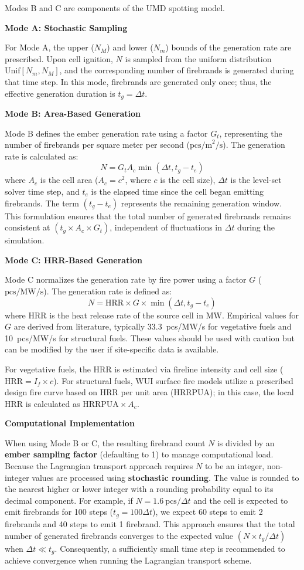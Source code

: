 Modes B and C are components of the UMD spotting model.

\textbf{Mode A: Stochastic Sampling}

For Mode A, the upper ($N_M$) and lower ($N_m$) bounds of the generation rate are prescribed. Upon cell ignition, $N$ is sampled from the uniform distribution $\text{Unif}[N_m, N_M]$, and the corresponding number of firebrands is generated during that time step. In this mode, firebrands are generated only once; thus, the effective generation duration is $t_g = \Delta t$.

\textbf{Mode B: Area-Based Generation}

Mode B defines the ember generation rate using a factor $G_t$, representing the number of firebrands per square meter per second ($\text{pcs/m}^2/\text{s}$). The generation rate is calculated as:
\[
N = G_t A_c \min(\Delta t, t_g - t_e)
\]
where $A_c$ is the cell area ($A_c = c^2$, where $c$ is the cell size), $\Delta t$ is the level-set solver time step, and $t_e$ is the elapsed time since the cell began emitting firebrands. The term $(t_g - t_e)$ represents the remaining generation window. This formulation ensures that the total number of generated firebrands remains consistent at $(t_g \times A_c \times G_t)$, independent of fluctuations in $\Delta t$ during the simulation.

\textbf{Mode C: HRR-Based Generation}

Mode C normalizes the generation rate by fire power using a factor $G$ ($\text{pcs/MW/s}$). The generation rate is defined as:
\[
N = \text{HRR} \times G \times \min(\Delta t, t_g - t_e)
\]
where $\text{HRR}$ is the heat release rate of the source cell in MW. Empirical values for $G$ are derived from literature, typically 33.3~pcs/MW/s for vegetative fuels and 10~pcs/MW/s for structural fuels. These values should be used with caution but can be modified by the user if site-specific data is available. 

For vegetative fuels, the HRR is estimated via fireline intensity and cell size ($\text{HRR} = I_f \times c$). For structural fuels, WUI surface fire models utilize a prescribed design fire curve based on HRR per unit area (HRRPUA); in this case, the local HRR is calculated as $\text{HRRPUA} \times A_c$.

\textbf{Computational Implementation}

When using Mode B or C, the resulting firebrand count $N$ is divided by an \textbf{ember sampling factor} (defaulting to 1) to manage computational load. Because the Lagrangian transport approach requires $N$ to be an integer, non-integer values are processed using \textbf{stochastic rounding}. The value is rounded to the nearest higher or lower integer with a rounding probability equal to its decimal component. For example, if $N = 1.6~\text{pcs}/\Delta t$ and the cell is expected to emit firebrands for 100 steps ($t_g = 100\Delta t$), we expect 60 steps to emit 2 firebrands and 40 steps to emit 1 firebrand. This approach ensures that the total number of generated firebrands converges to the expected value $(N \times t_g / \Delta t)$ when $\Delta t \ll t_g$. Consequently, a sufficiently small time step is recommended to achieve convergence when running the Lagrangian transport scheme.


